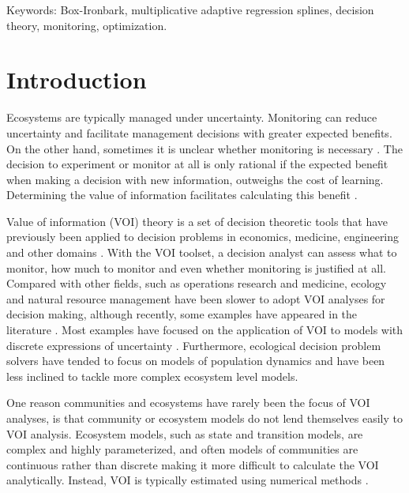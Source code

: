 \documentclass[]{article}
\begin{document}
Keywords: Box-Ironbark, multiplicative adaptive regression splines,
decision theory, monitoring, optimization. \newpage

\section{Introduction}\label{introduction}

Ecosystems are typically managed under uncertainty. Monitoring can
reduce uncertainty and facilitate management decisions with greater
expected benefits. On the other hand, sometimes it is unclear whether
monitoring is necessary \citep{Mcdonaldmadden2010}. The decision to
experiment or monitor at all is only rational if the expected benefit
when making a decision with new information, outweighs the cost of
learning. Determining the value of information facilitates calculating
this benefit \citep{Raiffa1968}.

Value of information (VOI) theory is a set of decision theoretic tools
that have previously been applied to decision problems in economics,
medicine, engineering and other domains
\citep{Dakins1999, Yokota2004, Claxton2008, Wu2013}. With the VOI
toolset, a decision analyst can assess what to monitor, how much to
monitor and even whether monitoring is justified at all. Compared with
other fields, such as operations research and medicine, ecology and
natural resource management have been slower to adopt VOI analyses for
decision making, although recently, some examples have appeared in the
literature
\citep[e.g.,][]{Polasky2001, Moore2011, Runge2011, Runting2013}. Most
examples have focused on the application of VOI to models with discrete
expressions of uncertainty \citep[e.g.,][]{Moore2012}. Furthermore,
ecological decision problem solvers have tended to focus on models of
population dynamics
\citep{Runge2011, Canessa2015, Johnson2014, Maxwell2015} and have been
less inclined to tackle more complex ecosystem level models.

One reason communities and ecosystems have rarely been the focus of VOI
analyses, is that community or ecosystem models do not lend themselves
easily to VOI analysis. Ecosystem models, such as state and transition
models, are complex and highly parameterized, and often models of
communities are continuous rather than discrete \citep[i.e., uncertainty
lies in the choices between discrete models as in][]{Runge2011} making
it more difficult to calculate the VOI analytically. Instead, VOI is
typically estimated using numerical methods \citep{Yokota2004}.
\end{document}
